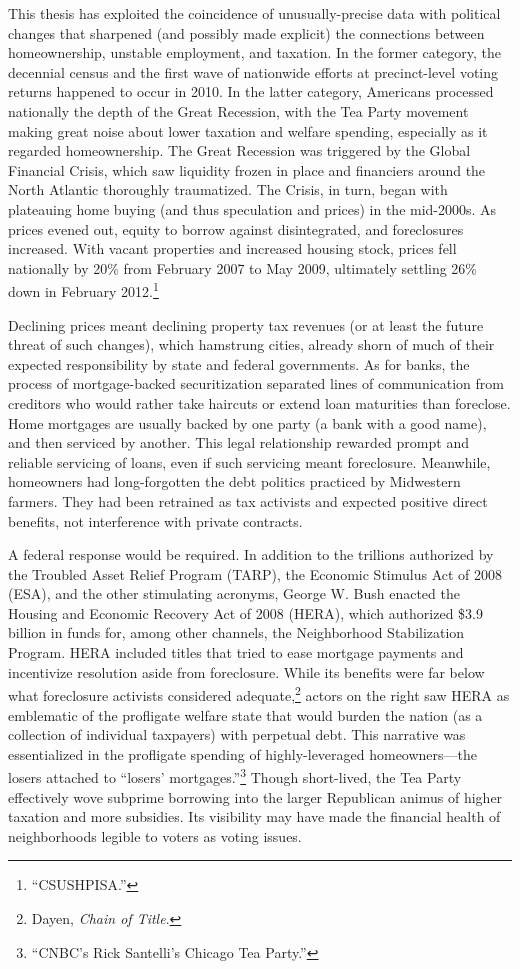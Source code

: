 \documentclass[12pt,oneside]{psthesis}
\begin{document}
This thesis has exploited the coincidence of unusually-precise data with political changes that sharpened (and possibly made explicit) the connections between homeownership, unstable employment, and taxation.
In the former category, the decennial census and the first wave of nationwide efforts at precinct-level voting returns happened to occur in 2010.
In the latter category, Americans processed nationally the depth of the Great Recession, with the Tea Party movement making great noise about lower taxation and welfare spending, especially as it regarded homeownership.
The Great Recession was triggered by the Global Financial Crisis, which saw liquidity frozen in place and financiers around the North Atlantic thoroughly traumatized.
The Crisis, in turn, began with plateauing home buying (and thus speculation and prices) in the mid-2000s.
As prices evened out, equity to borrow against disintegrated, and foreclosures increased.
With vacant properties and increased housing stock, prices fell nationally by 20\% from February 2007 to May 2009, ultimately settling 26\% down in February 2012.\footnote{``CSUSHPISA.''}

Declining prices meant declining property tax revenues (or at least the future threat of such changes), which hamstrung cities, already shorn of much of their expected responsibility by state and federal governments.
As for banks, the process of mortgage-backed securitization separated lines of communication from creditors who would rather take haircuts or extend loan maturities than foreclose.
Home mortgages are usually backed by one party (a bank with a good name), and then serviced by another.
This legal relationship rewarded prompt and reliable servicing of loans, even if such servicing meant foreclosure.
Meanwhile, homeowners had long-forgotten the debt politics practiced by Midwestern farmers.
They had been retrained as tax activists and expected positive direct benefits, not interference with private contracts.

A federal response would be required.
In addition to the trillions authorized by the Troubled Asset Relief Program (TARP), the Economic Stimulus Act of 2008 (ESA), and the other stimulating acronyms, George W. Bush enacted the Housing and Economic Recovery Act of 2008 (HERA), which authorized \$3.9 billion in funds for, among other channels, the Neighborhood Stabilization Program.
HERA included titles that tried to ease mortgage payments and incentivize resolution aside from foreclosure.
While its benefits were far below what foreclosure activists considered adequate,\footnote{Dayen, \emph{Chain of Title}.} actors on the right saw HERA as emblematic of the profligate welfare state that would burden the nation (as a collection of individual taxpayers) with perpetual debt.
This narrative was essentialized in the profligate spending of highly-leveraged homeowners---the losers attached to ``losers' mortgages.''\footnote{``CNBC's Rick Santelli's Chicago Tea Party.''}
Though short-lived, the Tea Party effectively wove subprime borrowing into the larger Republican animus of higher taxation and more subsidies.
Its visibility may have made the financial health of neighborhoods legible to voters as voting issues.
\end{document}

